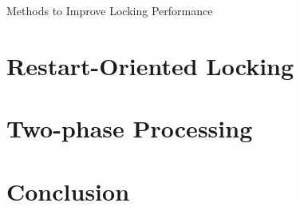 \documentclass[sans]{beamer}
\begin{document}
\begin{frame}{Methods to Improve Locking Performance}

\end{frame}

\section{Restart-Oriented Locking}

\section{Two-phase Processing}

\section{Conclusion}
\end{document}
